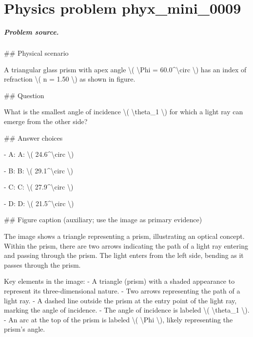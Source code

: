 
\chapter{Physics problem phyx\_mini\_0009}
\label{ch:PhyXMiniProblems_problem_phyx_mini_0009}

\paragraph{Problem source.}
\#\# Physical scenario

A triangular glass prism with apex angle \textbackslash{}( \textbackslash{}Phi = 60.0\textasciicircum{}\textbackslash{}circ \textbackslash{}) has an index of refraction \textbackslash{}( n = 1.50 \textbackslash{}) as shown in figure.

\#\# Question

What is the smallest angle of incidence \textbackslash{}( \textbackslash{}theta\_1 \textbackslash{}) for which a light ray can emerge from the other side?

\#\# Answer choices

- A: A: \textbackslash{}( 24.6\textasciicircum{}\textbackslash{}circ \textbackslash{})

- B: B: \textbackslash{}( 29.1\textasciicircum{}\textbackslash{}circ \textbackslash{})

- C: C: \textbackslash{}( 27.9\textasciicircum{}\textbackslash{}circ \textbackslash{})

- D: D: \textbackslash{}( 21.5\textasciicircum{}\textbackslash{}circ \textbackslash{})

\#\# Figure caption (auxiliary; use the image as primary evidence)

The image shows a triangle representing a prism, illustrating an optical concept. Within the prism, there are two arrows indicating the path of a light ray entering and passing through the prism. The light enters from the left side, bending as it passes through the prism.

Key elements in the image:
- A triangle (prism) with a shaded appearance to represent its three-dimensional nature.
- Two arrows representing the path of a light ray.
- A dashed line outside the prism at the entry point of the light ray, marking the angle of incidence.
- The angle of incidence is labeled \textbackslash{}( \textbackslash{}theta\_1 \textbackslash{}).
- An arc at the top of the prism is labeled \textbackslash{}( \textbackslash{}Phi \textbackslash{}), likely representing the prism's angle.

